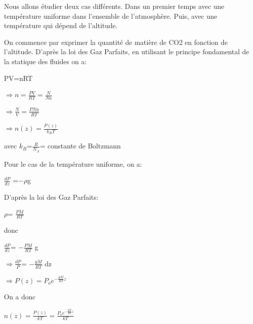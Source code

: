 \documentclass[a4paper, 12pt]{report} %
\begin{document}
Nous allons étudier deux cas différents. Dans un premier temps avec une température uniforme dans l'ensemble de l'atmosphère. Puis, avec une température qui dépend de l'altitude. 

On commence par exprimer la quantité de matière de CO2 en fonction de l'altitude.
D'après la loi des Gaz Parfaits, en utilisant le principe fondamental de la statique des fluides on a: 

\begin{center}
    PV=nRT
\end{center}

\begin{center}
    $\Rightarrow n= \frac{PV}{RT}=\frac{N}{Na}$
\end{center}

\begin{center}
    $\Rightarrow\frac{N}{V}= \frac{PNa}{RT}$
\end{center}

\begin{center}
    $\Rightarrow n(z)= \frac{P(z)}{k_BT} $ 
\end{center}   

avec $k_B$=$\frac{R}{N_A}$= constante de Boltzmann \vspace{\baselineskip}

Pour le cas de la température uniforme, on a:

\begin{center}
    $\frac{dP}{dz}$ =$-\rho$g
\end{center}

D'après la loi des Gaz Parfaits: 
\begin{center}
    $\rho$= $\frac{PM}{RT}$
\end{center}

donc 
\begin{center}
    $\frac{dP}{dz}$= $-\frac{PM}{RT}$ g
\end{center}

\begin{center}
    $\Rightarrow\frac{dP}{P}$= $-\frac{gM}{RT}$ dz
\end{center}

\begin{center}
    $\Rightarrow P(z)= P_o e^{-\frac{gM}{RT} z }$
\end{center}

On a donc 
\begin{center}
	$n(z)=\frac{P(z)}{kT}= \frac{ P_o e^{-\frac{gM}{RT} z }}{kT}$
 \end{center}
\end{document}
